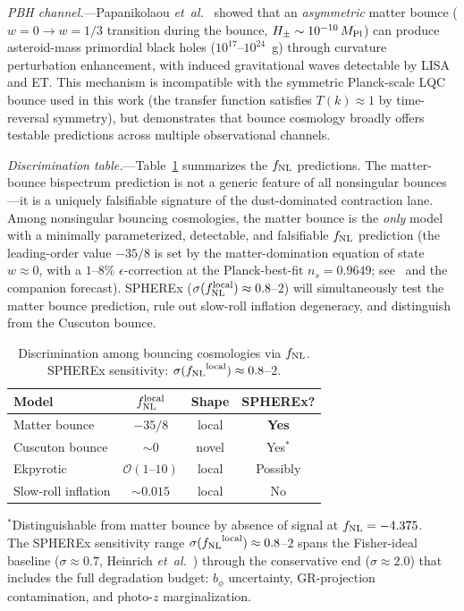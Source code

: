 \documentclass[aps,prd,twocolumn,superscriptaddress,showpacs,preprintnumbers,nofootinbib,longbibliography,floatfix]{revtex4-2}
\newcommand{\MPl}{M_{\rm Pl}}
\newcommand{\etal}{\textit{et~al.}}
\newcommand{\fnl}{f_{\rm NL}}
\begin{document}
\textit{PBH channel.}---Papanikolaou \etal~\cite{Papanikolaou:2024pbh} showed that an \emph{asymmetric} matter bounce ($w = 0 \to w = 1/3$ transition during the bounce, $H_{\pm} \sim 10^{-10}\,\MPl$) can produce asteroid-mass primordial black holes ($10^{17}\text{--}10^{24}$~g) through curvature perturbation enhancement, with induced gravitational waves detectable by LISA and ET. This mechanism is incompatible with the symmetric Planck-scale LQC bounce used in this work (the transfer function satisfies $T(k) \approx 1$ by time-reversal symmetry), but demonstrates that bounce cosmology broadly offers testable predictions across multiple observational channels.

\textit{Discrimination table.}---Table~\ref{tab:bounce_disc} summarizes the $\fnl$ predictions. The matter-bounce bispectrum prediction is not a generic feature of all nonsingular bounces---it is a uniquely falsifiable signature of the dust-dominated contraction lane. Among nonsingular bouncing cosmologies, the matter bounce is the \emph{only} model with a minimally parameterized, detectable, and falsifiable $\fnl$ prediction (the leading-order value $-35/8$ is set by the matter-domination equation of state $w \approx 0$, with a $1$--$8\%$ $\epsilon$-correction at the Planck-best-fit $n_s = 0.9649$; see~\cite{Cai:2009fn} and the companion forecast). SPHEREx ($\sigma(\fnl^{\rm local}) \approx 0.8$--$2$) will simultaneously test the matter bounce prediction, rule out slow-roll inflation degeneracy, and distinguish from the Cuscuton bounce.

\begin{table}[t]
\caption{Discrimination among bouncing cosmologies via $\fnl$. SPHEREx sensitivity: $\sigma({\fnl}^{\rm local}) \approx 0.8$--$2$.}\label{tab:bounce_disc}
\begin{ruledtabular}
\begin{tabular}{lccc}
Model & $\fnl^{\rm local}$ & Shape & SPHEREx? \\
\hline
Matter bounce & $-35/8$ & local & \textbf{Yes} \\
Cuscuton bounce & $\sim 0$ & novel & Yes$^*$ \\
Ekpyrotic & $\mathcal{O}(1\text{--}10)$ & local & Possibly \\
Slow-roll inflation & $\sim 0.015$ & local & No \\
\end{tabular}
\end{ruledtabular}
\begin{flushleft}
\footnotesize{$^*$Distinguishable from matter bounce by absence of signal at $\fnl = -4.375$.\\
The SPHEREx sensitivity range $\sigma({\fnl}^{\rm local}) \approx 0.8$--$2$ spans the Fisher-ideal baseline ($\sigma \approx 0.7$, Heinrich \etal~\cite{Heinrich:2023}) through the conservative end ($\sigma \approx 2.0$) that includes the full degradation budget: $b_\phi$ uncertainty, GR-projection contamination, and photo-$z$ marginalization.}
\end{flushleft}
\end{table}
\end{document}
